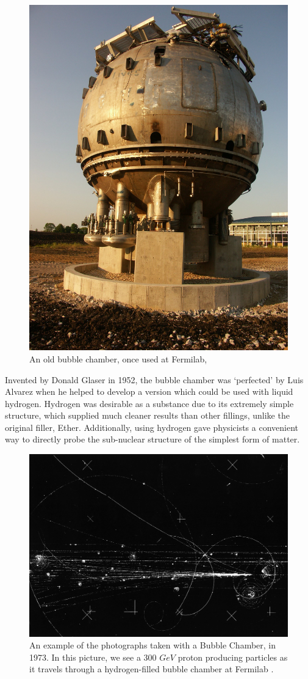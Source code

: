\begin{figure}[ht]
	\centering
	\includegraphics[width=0.5\linewidth]{./figures/bubblechamberfnal.jpg}
	\caption{An old bubble chamber, once used at Fermilab,
	 \cite{FNALBubbleChamber2005}}
	\label{fig:bubble_chamber}
\end{figure}

Invented by Donald Glaser in 1952, the bubble chamber was `perfected' by Luis
Alvarez when he helped to develop a version which could be used with liquid
hydrogen. Hydrogen was desirable as a substance due to its extremely simple
structure, which supplied much cleaner results than other fillings, unlike the
original filler, Ether. Additionally, using hydrogen gave physicists a
convenient way to directly probe the sub-nuclear structure of the simplest form
of matter.

\begin{figure}[ht]
	\centering
	\includegraphics[width=0.5\linewidth]{./figures/bubble_chamber_tracks.jpg}
	\caption{
		An example of the photographs taken with a Bubble Chamber, in 1973.
		In this picture, we see a 300 $GeV$ proton producing particles as it travels
		through a hydrogen-filled bubble chamber at Fermilab  \cite{HD6B235}.
	}
	\label{fig:bubble_tracks}
\end{figure}

